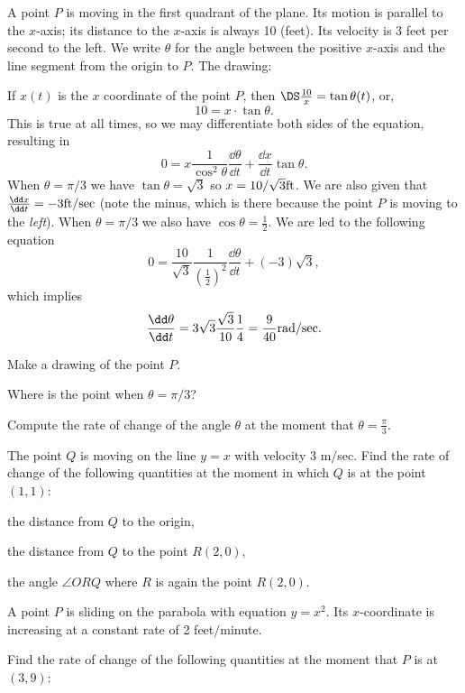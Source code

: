 \begin{multicols}{2}
\problem A point $P$ is moving in the first quadrant of the plane.  Its motion
is parallel to the $x$-axis; its distance to the $x$-axis is always 10 (feet).
Its velocity is 3 feet per second to the left.  We write $\theta$ for the
angle between the positive $x$-axis and the line segment from the origin to
$P$.
\answer
The drawing:
\begin{center}
  
\end{center}
If $x(t)$ is the $x$ coordinate of the point $P$, then
$\DS \frac{10} {x} = \tan \theta(t)$, or,
\[
10 = x\cdot \tan \theta.
\]
This is true at all times, so we may differentiate both sides
of the equation, resulting in
\[
0 = x \frac{1} {\cos^2\theta}\frac{\dd\theta} {\dd t} + \frac{\dd x} {\dd t}\tan \theta.
\]
When $\theta=\pi/3$ we have $\tan\theta = \sqrt{3}$ so $x=10/\sqrt{3}{\rm ft}$.
We are also given that $\frac{\dd x} {\dd t} = -3 {\rm ft}/{\rm sec}$
(note the minus, which
is there because the point $P$ is moving to the \emph{left}).
When $\theta=\pi/3$ we also have $\cos \theta = \frac12$.
We are led to the following equation
\[
0 = \frac{10} {\sqrt{3}} \frac{1} {(\frac12)^2} \frac{\dd \theta} {\dd t}
+ (-3) \sqrt{3},
\]
which implies
\[
 \frac{\dd \theta} {\dd t}
= 3\sqrt{3} \frac{\sqrt{3}} {10} \frac{1} {4}
= \frac{9} {40} {\rm rad}/{\rm sec}.
\]


\endanswer
\subprob  Make a drawing of the point $P$.

\subprob  Where is the point when $\theta=\pi/3$?

\subprob  Compute the rate of change of the angle $\theta$ at the moment
that $\theta=\frac\pi3$.



\problem The point $Q$ is moving on the line $y=x$ with velocity 3 m$/$sec.
Find the rate of change of the following quantities at the moment in which
$Q$ is at the point $(1,1)$:

\subprob the distance from $Q$ to the origin,

\subprob the distance from $Q$ to the point $R(2,0)$,

\subprob the angle $\angle ORQ$ where $R$ is again the point $R(2,0)$.


\problem A point $P$ is sliding on the parabola with equation $y=x^2$.  Its
$x$-coordinate is increasing at a constant rate of 2 feet$/$minute.

Find the rate of change of the following quantities at the moment that
$P$ is at $(3, 9)$:


\end{multicols}
